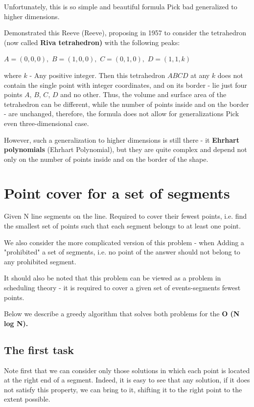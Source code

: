 Unfortunately, this is so simple and beautiful formula Pick bad generalized to higher dimensions.

Demonstrated this Reeve (Reeve), proposing in 1957 to consider the tetrahedron (now called \textbf{Riva tetrahedron)} with the following peaks:

$A = (0,0,0),$
$B = (1,0,0),$
$C = (0,1,0),$
$D = (1,1,k)$

where $k$ - Any positive integer. Then this tetrahedron $ABCD$ at any $k$ does not contain the single point with integer coordinates, and on its border - lie just four points $A$, $B$, $C$, $D$ and no other. Thus, the volume and surface area of ​​the tetrahedron can be different, while the number of points inside and on the border - are unchanged, therefore, the formula does not allow for generalizations Pick even three-dimensional case.

However, such a generalization to higher dimensions is still there - it \textbf{Ehrhart polynomials} (Ehrhart Polynomial), but they are quite complex and depend not only on the number of points inside and on the border of the shape.

\section{ Point cover for a set of segments }
Given N line segments on the line. Required to cover their fewest points, i.e. find the smallest set of points such that each segment belongs to at least one point.

We also consider the more complicated version of this problem - when Adding a "prohibited" a set of segments, i.e. no point of the answer should not belong to any prohibited segment.

It should also be noted that this problem can be viewed as a problem in scheduling theory - it is required to cover a given set of events-segments fewest points.

Below we describe a greedy algorithm that solves both problems for the \textbf{O (N log N).}

\subsection{ The first task }
Note first that we can consider only those solutions in which each point is located at the right end of a segment. Indeed, it is easy to see that any solution, if it does not satisfy this property, we can bring to it, shifting it to the right point to the extent possible.

